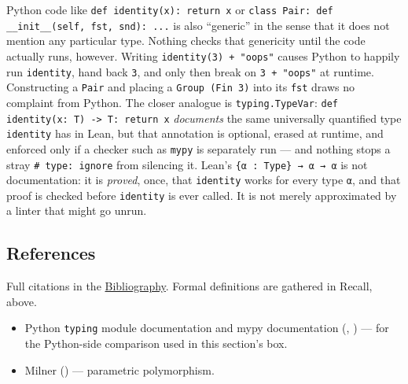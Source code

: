 \begin{progcorner}

Python code like \texttt{def identity(x): return x} or \texttt{class Pair: def \_\allowbreak{}\_\allowbreak{}init\_\allowbreak{}\_\allowbreak{}(self, fst, snd): ...} is also ``generic'' in the sense that it does not mention any particular type. Nothing checks that genericity until the code actually runs, however. Writing \texttt{identity(3) + "oops"} causes Python to happily run \texttt{identity}, hand back \texttt{3}, and only then break on \texttt{3 + "oops"} at runtime. Constructing a \texttt{Pair} and placing a \texttt{Group (Fin 3)} into its \texttt{fst} draws no complaint from Python. The closer analogue is \texttt{typing.TypeVar}: \texttt{def identity(x: T) -\allowbreak{}> T: return x} \emph{documents} the same universally quantified type \texttt{identity} has in Lean, but that annotation is optional, erased at runtime, and enforced only if a checker such as \texttt{mypy} is separately run --- and nothing stops a stray \texttt{\# type: ignore} from silencing it. Lean's \texttt{\{α : Type\} → α → α} is not documentation: it is \emph{proved}, once, that \texttt{identity} works for every type \texttt{α}, and that proof is checked before \texttt{identity} is ever called. It is not merely approximated by a linter that might go unrun.

\end{progcorner}

\subsection{References}\label{sec:02-functions-and-structures:02-type-parameters:3}

Full citations in the \hyperref[sec:root:bibliography:1]{Bibliography}. Formal definitions are gathered in Recall, above.

\begin{itemize}
\tightlist
\item
  Python \texttt{typing} module documentation and mypy documentation (\cite{PythonTyping}, \cite{MypyDocs}) --- for the Python-side comparison used in this section's box.
\item
  Milner (\cite{Milner1978}) --- parametric polymorphism.
\end{itemize}
